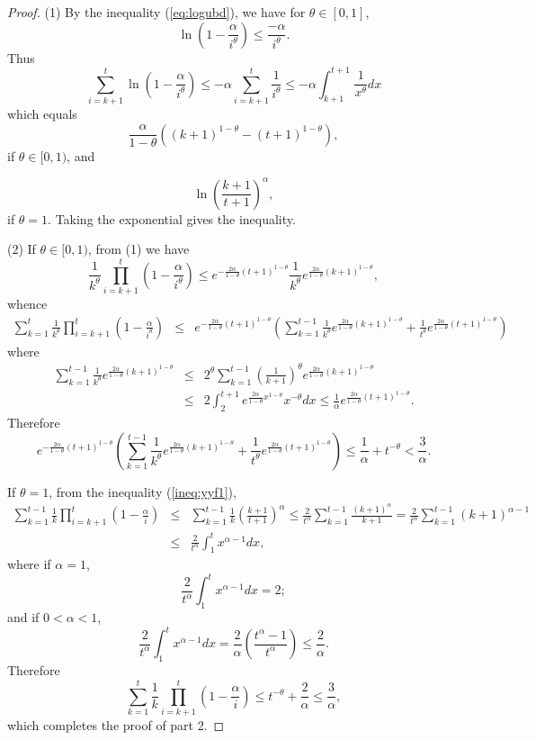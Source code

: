 \documentclass[twoside]{amsart}
\theoremstyle{theorem}
\theoremstyle{definition}
\theoremstyle{remark}
\begin{document}
\begin{proof}

(1) By the inequality (\ref{eq:logubd}), we have for $\theta \in [0,1]$,
\[ \ln \left(1 - \frac{\alpha}{i^\theta}\right) \leq \frac{-\alpha}{i^\theta}. \]
Thus
\begin{equation} \label{ineq:yyf1}
\sum_{i=k+1}^t \ln \left( 1-\frac{\alpha}{i^\theta} \right) \leq  -\alpha \sum_{i=k+1}^t \frac{1}{i^\theta}
 \leq  -\alpha \int_{k+1}^{t+1} \frac{1}{x^\theta} d x
\end{equation}
which equals
\[\frac{\alpha}{1-\theta} \left((k+1)^{1-\theta}-(t+1)^{1-\theta} \right), \]
if $\theta\in [0,1)$, and

\[ \ln \left(\frac{k+1}{t+1}\right)^\alpha, \]
if $\theta=1$. Taking the exponential gives the inequality.

(2) If $\theta\in [0,1)$, from (1) we have
\[ \frac{1}{k^\theta}\prod_{i=k+1}^t \left(1-\frac{\alpha}{i^\theta}\right) \leq e^{-\frac{2\alpha}{1-\theta}(t+1)^{1-\theta}}
\frac{1}{k^\theta}e^{\frac{2\alpha}{1-\theta} (k+1)^{1-\theta}}, \]
whence
\begin{eqnarray*}
\sum_{k=1}^{t} \frac{1}{k^\theta}\prod_{i=k+1}^t \left(1-\frac{\alpha}{i^\theta}\right) & \leq & e^{-\frac{2\alpha}{1-\theta}(t+1)^{1-\theta}}
\left( \sum_{k=1}^{t-1} \frac{1}{k^\theta}e^{\frac{2\alpha}{1-\theta} (k+1)^{1-\theta}} + \frac{1}{t^\theta} e^{\frac{2\alpha}{1-\theta} (t+1)^{1-\theta}} \right)
\end{eqnarray*}
where
\begin{eqnarray*}
\sum_{k=1}^{t-1} \frac{1}{k^\theta}e^{\frac{2\alpha}{1-\theta} (k+1)^{1-\theta}} & \leq & 2^\theta \sum_{k=1}^{t-1}
\left(\frac{1}{k+1}\right)^\theta e^{\frac{2\alpha}{1-\theta} (k+1)^{1-\theta}} \\
& \leq & 2 \int_2^{t+1}  e^{\frac{2\alpha}{1-\theta} x^{1-\theta}} x^{-\theta} d x \leq
\frac{1}{\alpha} e^{\frac{2\alpha}{1-\theta}(t+1)^{1-\theta}}.
\end{eqnarray*}
Therefore
\[ e^{-\frac{2\alpha}{1-\theta}(t+1)^{1-\theta}} \left( \sum_{k=1}^{t-1} \frac{1}{k^\theta}e^{\frac{2\alpha}{1-\theta} (k+1)^{1-\theta}} +
\frac{1}{t^\theta} e^{\frac{2\alpha}{1-\theta} (t+1)^{1-\theta}} \right) \leq \frac{1}{\alpha} + t^{-\theta} < \frac{3}{\alpha}. \]

If $\theta=1$, from the inequality (\ref{ineq:yyf1}),
\begin{eqnarray*}
\sum_{k=1}^{t-1} \frac{1}{k} \prod_{i=k+1}^t \left( 1 - \frac{\alpha}{i}
\right) & \leq & \sum_{k=1}^{t-1} \frac{1}{k}\left(\frac{k+1}{t+1}\right)^\alpha
\leq \frac{2}{t^\alpha} \sum_{k=1}^{t-1} \frac{(k+1)^\alpha}{k+1}  = \frac{2}{t^\alpha} \sum_{k=1}^{t-1} (k+1)^{\alpha-1}  \\
& \leq  & \frac{2}{t^\alpha} \int_1^{t} x^{\alpha-1} d x,
\end{eqnarray*}
where if $\alpha=1$,
\[ \frac{2}{t^\alpha} \int_1^{t} x^{\alpha-1} d x = 2; \]
and if $0<\alpha<1$,
\[ \frac{2}{t^\alpha} \int_1^{t} x^{\alpha-1} d x = \frac{2}{\alpha}\left(\frac{t^\alpha-1}{t^\alpha}\right) \leq \frac{2}{\alpha}.\]
Therefore
\[\sum_{k=1}^{t} \frac{1}{k} \prod_{i=k+1}^t \left( 1 - \frac{\alpha}{i}\right)\leq t^{-\theta} + \frac{2}{\alpha} \leq \frac{3}{\alpha}, \]
which completes the proof of part 2.


\end{proof}
\end{document}

